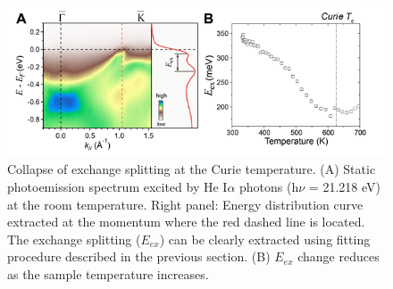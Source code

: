 \begin{figure}[htbp]
	\begin{center}
		\includegraphics[width=150mm]{figs/NiFigS6}
	\end{center}
	\caption{Collapse of exchange splitting at the Curie temperature. (A) Static photoemission spectrum excited by He I$\alpha$ photons (h$\nu$ = 21.218 eV) at the room temperature. Right panel: Energy distribution curve extracted at the momentum where the red dashed line is located. The exchange splitting ($E_{ex}$) can be clearly extracted using fitting procedure described in the previous section. (B) $E_{ex}$ change reduces as the sample temperature increases.}
	\label{fig: NiSIfig6}
\end{figure}